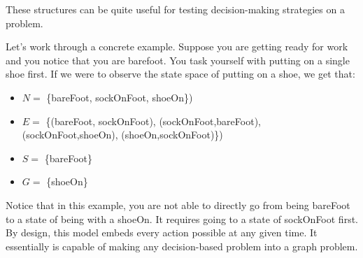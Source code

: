 \noindent
These structures can be quite useful for testing decision-making strategies on a problem.

Let's work through a concrete example. Suppose you are getting ready for work and you notice that you are barefoot. You task yourself with putting on a single shoe first. If we were to observe the state space of putting on a shoe, we get that:
\begin{itemize}
    \item $N =$ \{bareFoot, sockOnFoot, shoeOn\})
    \item $E =$ \{(bareFoot, sockOnFoot), (sockOnFoot,bareFoot), (sockOnFoot,shoeOn), (shoeOn,sockOnFoot)\})
    \item $S =$ \{bareFoot\}
    \item $G =$ \{shoeOn\}
\end{itemize}

\begin{center}
\end{center}
\noindent
Notice that in this example, you are not able to directly go from being bareFoot to a state of being with a shoeOn. 
It requires going to a state of sockOnFoot first. By design, this 
model embeds every action possible
at any given time. It essentially is capable of making any decision-based problem into a graph problem.

